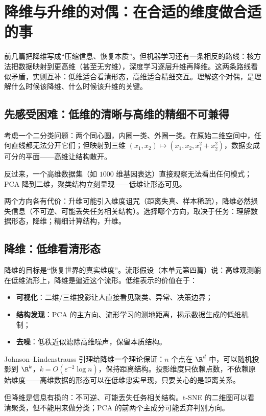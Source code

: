 \section{降维与升维的对偶：在合适的维度做合适的事}

前几篇把降维写成``压缩信息、恢复本质''。但机器学习还有一条相反的路线：核方法把数据映射到更高维（甚至无穷维），深度学习逐层升维再降维。这两条路线看似矛盾，实则互补：低维适合看清形态，高维适合精细交互。理解这个对偶，是理解什么时候该降维、什么时候该升维的关键。

\subsection{先感受困难：低维的清晰与高维的精细不可兼得}

考虑一个二分类问题：两个同心圆，内圈一类、外圈一类。在原始二维空间中，任何直线都无法分开它们；但映射到三维 $(x_1,x_2)\mapsto(x_1,x_2,x_1^2+x_2^2)$，数据变成可分的平面——高维让结构散开。

反过来，一个高维数据集（如 $1000$ 维基因表达）直接观察无法看出任何模式；PCA 降到二维，聚类结构立刻显现——低维让形态可见。

两个方向各有代价：升维可能引入维度诅咒（距离失真、样本稀疏），降维必然损失信息（不可逆、可能丢失任务相关结构）。选择哪个方向，取决于任务：理解数据形态，降维；精细计算结构，升维。

\subsection{降维：低维看清形态}

降维的目标是``恢复世界的真实维度''。流形假设（本单元第四篇）说：高维观测躺在低维流形上，降维是逼近这个流形。低维表示的价值在于：

\begin{itemize}
\tightlist
\item
  \textbf{可视化}：二维/三维投影让人直接看见聚类、异常、决策边界；
\item
  \textbf{结构发现}：PCA 的主方向、流形学习的测地距离，揭示数据生成的低维机制；
\item
  \textbf{去噪}：低秩近似滤除高维噪声，保留本质结构。
\end{itemize}

Johnson--Lindenstrauss 引理给降维一个理论保证：$n$ 个点在 $\R^d$ 中，可以随机投影到 $\R^k$，$k=O(\varepsilon^{-2}\log n)$，保持距离结构。投影维度只依赖点数，不依赖原始维度——高维数据的形态可以在低维忠实呈现，只要关心的是距离关系。

但降维是信息有损的：不可逆、可能丢失任务相关结构。t-SNE 的二维图可以看清聚类，但不能用来做分类；PCA 的前两个主成分可能丢弃判别方向。

